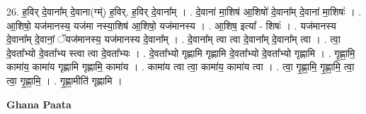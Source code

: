 \documentclass[17pt]{extarticle}
\begin{document}
26. ह॒विर् दे॒वाना᳚म् दे॒वाना(ग्म्॑) ह॒विर्. ह॒विर् दे॒वाना᳚म् । . दे॒वाना॑ मा॒शिष॑ आ॒शिषो॑ दे॒वाना᳚म् दे॒वाना॑ मा॒शिषः॑ । . आ॒शिषो॒ यज॑मानस्य॒ यज॑मा नस्या॒शिष॑ आ॒शिषो॒ यज॑मानस्य । . आ॒शिष॒ इत्या᳚ - शिषः॑ । . यज॑मानस्य दे॒वाना᳚म् दे॒वानां॒ ॅयज॑मानस्य॒ यज॑मानस्य दे॒वाना᳚म् । . दे॒वाना᳚म् त्वा त्वा दे॒वाना᳚म् दे॒वाना᳚म् त्वा । . त्वा॒ दे॒वता᳚भ्यो दे॒वता᳚भ्य स्त्वा त्वा दे॒वता᳚भ्यः । . दे॒वता᳚भ्यो गृह्णामि गृह्णामि दे॒वता᳚भ्यो दे॒वता᳚भ्यो गृह्णामि । . गृ॒ह्णा॒मि॒ कामा॑य॒ कामा॑य गृह्णामि गृह्णामि॒ कामा॑य । . कामा॑य त्वा त्वा॒ कामा॑य॒ कामा॑य त्वा । . त्वा॒ गृ॒ह्णा॒मि॒ गृ॒ह्णा॒मि॒ त्वा॒ त्वा॒ गृ॒ह्णा॒मि॒ । . गृ॒ह्णा॒मीति॑ गृह्णामि । \newline

\textbf{Ghana Paata } \newline
\end{document}
